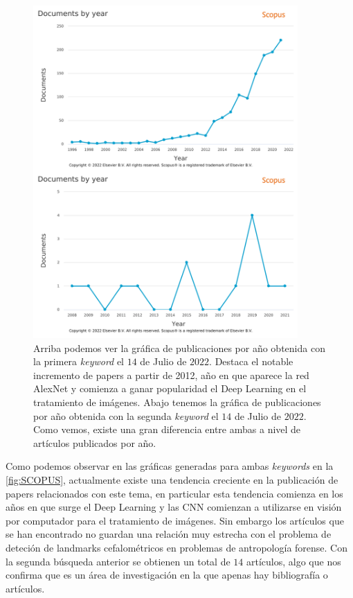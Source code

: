         \begin{figure}[htpb]
            \centering
            \includegraphics[width=0.9\textwidth]{img/SCOPUS_UNIDOS.png}
            \caption{Arriba podemos ver la gráfica de publicaciones por año obtenida con la primera \textit{keyword} el $14$ de Julio de $2022$. Destaca el notable incremento de papers a partir de 2012, año en que aparece la red AlexNet y comienza a ganar popularidad el Deep Learning en el tratamiento de imágenes. Abajo tenemos la gráfica de publicaciones por año obtenida con la segunda \textit{keyword} el $14$ de Julio de $2022$. Como vemos, existe una gran diferencia entre ambas a nivel de artículos publicados por año.}
            \label{fig:SCOPUS}
        \end{figure}
        
        \medskip
        
        \noindent Como podemos observar en las gráficas generadas para ambas \textit{keywords} en la \autoref{fig:SCOPUS}, actualmente existe una tendencia creciente en la publicación de papers relacionados con este tema, en particular esta tendencia comienza en los años en que surge el Deep Learning y las CNN comienzan a utilizarse en visión por computador para el tratamiento de imágenes. Sin embargo los artículos que se han encontrado no guardan una relación muy estrecha con el problema de deteción de landmarks cefalométricos en problemas de antropología forense. Con la segunda búsqueda anterior se obtienen un total de $14$ artículos, algo que nos confirma que es un área de investigación en la que apenas hay bibliografía o artículos.

